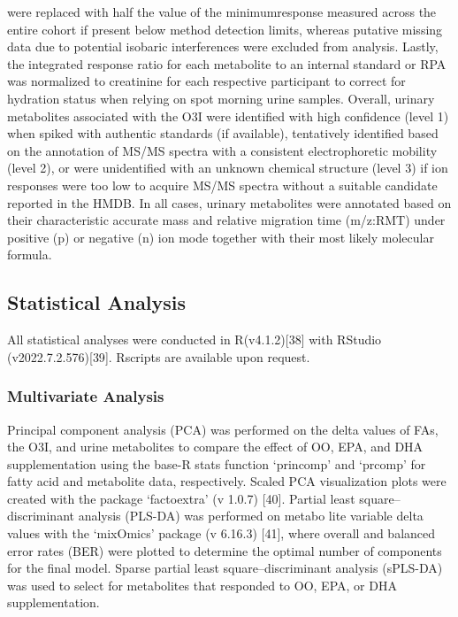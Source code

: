 \documentclass[journal=jacsat,manuscript=article]{achemso}
\begin{document}
were replaced with half the value of the minimumresponse measured across
the entire cohort if present below method detection limits, whereas
putative missing data due to potential isobaric interferences were
excluded from analysis. Lastly, the integrated response ratio for each
metabolite to an internal standard or RPA was normalized to creatinine
for each respective participant to correct for hydration status when
relying on spot morning urine samples. Overall, urinary metabolites
associated with the O3I were identified with high confidence (level 1)
when spiked with authentic standards (if available), tentatively
identified based on the annotation of MS/MS spectra with a consistent
electrophoretic mobility (level 2), or were unidentified with an unknown
chemical structure (level 3) if ion responses were too low to acquire
MS/MS spectra without a suitable candidate reported in the HMDB. In all
cases, urinary metabolites were annotated based on their characteristic
accurate mass and relative migration time (m/z:RMT) under positive (p)
or negative (n) ion mode together with their most likely molecular
formula.

\subsection{Statistical Analysis}\label{statistical-analysis}

All statistical analyses were conducted in R(v4.1.2){[}38{]} with
RStudio (v2022.7.2.576){[}39{]}. Rscripts are available upon request.

\subsubsection{Multivariate Analysis}\label{multivariate-analysis}

Principal component analysis (PCA) was performed on the delta values of
FAs, the O3I, and urine metabolites to compare the effect of OO, EPA,
and DHA supplementation using the base-R stats function `princomp' and
`prcomp' for fatty acid and metabolite data, respectively. Scaled PCA
visualization plots were created with the package `factoextra' (v 1.0.7)
{[}40{]}. Partial least square--discriminant analysis (PLS-DA) was
performed on metabo lite variable delta values with the `mixOmics'
package (v 6.16.3) {[}41{]}, where overall and balanced error rates
(BER) were plotted to determine the optimal number of components for the
final model. Sparse partial least square--discriminant analysis
(sPLS-DA) was used to select for metabolites that responded to OO, EPA,
or DHA supplementation.
\end{document}
